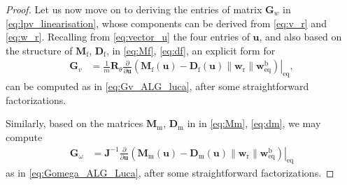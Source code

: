 \begin{proof}
Let us now move on to deriving the entries of matrix $\boldsymbol{G}_{w}$ in \eqref{eq:lpv_linearisation}, whose components can be derived from  \eqref{eq:v_r} and \eqref{eq:w_r}. Recalling from \eqref{eq:vector_u} the four entries of $\boldsymbol{u}$, and also based on the structure of $\boldsymbol{M}_{\text{f}}$,
$\boldsymbol{D}_{\text{f}}$,  in \eqref{eq:Mf}, \eqref{eq:df}, an explicit form for
\begin{align}
    \boldsymbol{G}_{v} \! &= \! 
    \frac{1}{m} \boldsymbol{R}_\theta \! \left.\frac{\partial}{\partial \boldsymbol{u}} \! 
     \left( \boldsymbol{M}_{\text{f}}(\boldsymbol{u}) \! - \! \boldsymbol{D}_{\text{f}}(\boldsymbol{u}) \lVert \boldsymbol{w}_{\text{r}} \rVert \boldsymbol{w}^{\text{b}}_{\mathrm{eq}}   \right)\right|_{\mathrm{eq}} ,
\end{align}
can be computed as in \eqref{eq:Gv_ALG_luca}, after some straightforward factorizations. 

Similarly, based on the matrices  $\boldsymbol{M}_{\text{m}}$, $\boldsymbol{D}_{\text{m}}$ in   in \eqref{eq:Mm}, \eqref{eq:dm}, 
we may compute
\begin{align}
     \boldsymbol{G}_{\omega} \! &= \!  \boldsymbol{J}^{-1} \! \left.\frac{\partial}{\partial \boldsymbol{u}} \! 
     \left( \boldsymbol{M}_{\text{m}}(\boldsymbol{u}) \! - \! \boldsymbol{D}_{\text{m}}(\boldsymbol{u}) \lVert \boldsymbol{w}_{\text{r}} \rVert \boldsymbol{w}^{\text{b}}_{\mathrm{eq}}   \right)\right|_{\mathrm{eq}}
\end{align}
as in \eqref{eq:Gomega_ALG_Luca}, after some straightforward factorizations. 





\end{proof}
